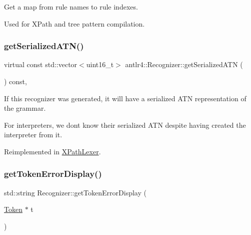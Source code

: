 Get a map from rule names to rule indexes. 

Used for X\+Path and tree pattern compilation. 

\mbox{\label{classantlr4_1_1Recognizer_a06b4b78084e75ebafbbd86008914fb51}} 
\subsubsection{\texorpdfstring{get\+Serialized\+A\+T\+N()}{getSerializedATN()}}
{\footnotesize\ttfamily virtual const std\+::vector$<$uint16\+\_\+t$>$ antlr4\+::\+Recognizer\+::get\+Serialized\+A\+TN (\begin{DoxyParamCaption}{ }\end{DoxyParamCaption}) const\hspace{0.3cm}{\ttfamily [inline]}, {\ttfamily [virtual]}}



If this recognizer was generated, it will have a serialized A\+TN representation of the grammar. 

For interpreters, we don\textquotesingle{}t know their serialized A\+TN despite having created the interpreter from it. 



Reimplemented in \hyperlink{classXPathLexer_a59ee9cba029ff18c8468321b75da8f66}{X\+Path\+Lexer}.

\mbox{\label{classantlr4_1_1Recognizer_a4f7740ffef4e68ea219a3f3103281e1d}} 
\subsubsection{\texorpdfstring{get\+Token\+Error\+Display()}{getTokenErrorDisplay()}}
{\footnotesize\ttfamily std\+::string Recognizer\+::get\+Token\+Error\+Display (\begin{DoxyParamCaption}\item[{\hyperlink{classantlr4_1_1Token}{Token} $\ast$}]{t }\end{DoxyParamCaption})\hspace{0.3cm}{\ttfamily [virtual]}}

